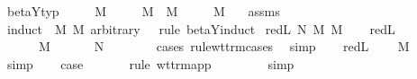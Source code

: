 \begin{isabellebody}
%
\isadelimproof
\isanewline
%
\endisadelimproof
\isanewline
{}\isamarkupfalse%
\ beta{\isacharunderscore}Y{\isacharunderscore}typ{\isacharcolon}\isanewline
\ \ \ {\isachardoublequoteopen}{\isasymGamma}\ {\isasymturnstile}\ M\ {\isacharcolon}\ {\isasymsigma}{\isachardoublequoteclose}\isanewline
\ \ \ {\isachardoublequoteopen}M\ {\isasymRightarrow}\ M{\isacharprime}{\isachardoublequoteclose}\isanewline
\ \ \ {\isachardoublequoteopen}{\isasymGamma}\ {\isasymturnstile}\ M{\isacharprime}\ {\isacharcolon}\ {\isasymsigma}{\isachardoublequoteclose}\isanewline
%
\isadelimproof
%
\endisadelimproof
%
\isatagproof
{}\isamarkupfalse%
\ assms{\isacharparenleft}{}{\isacharcomma}{}{\isacharparenright}\isanewline
{}\isamarkupfalse%
\ {\isacharparenleft}induct\ \ M\ M{\isacharprime}\ arbitrary{\isacharcolon}\ {\isasymGamma}\ {\isasymsigma}\ rule{\isacharcolon}\ beta{\isacharunderscore}Y{\isachardot}induct{\isacharparenright}\isanewline
{}\isamarkupfalse%
\ {\isacharparenleft}red{\isacharunderscore}L\ N\ M\ M{\isacharprime}{\isacharparenright}\isanewline
\ \ \isamarkupfalse%
\ red{\isacharunderscore}L{\isacharparenleft}{}{\isacharparenright}\ \isamarkupfalse%
\ {\isasymtau}\ \ {}{\isacharcolon}\ {\isachardoublequoteopen}{\isasymGamma}\ {\isasymturnstile}\ M\ {\isacharcolon}\ {\isasymtau}\ {\isasymrightarrow}\ {\isasymsigma}{\isachardoublequoteclose}\ {\isachardoublequoteopen}{\isasymGamma}\ {\isasymturnstile}\ N\ {\isacharcolon}\ {\isasymtau}{\isachardoublequoteclose}\isanewline
\ \ \ \ \isamarkupfalse%
\ {\isacharparenleft}cases\ rule{\isacharcolon}wt{\isacharunderscore}trm{\isachardot}cases{\isacharparenright}\ \isamarkupfalse%
\ simp\isanewline
\ \ \isamarkupfalse%
\ red{\isacharunderscore}L{\isacharparenleft}{}{\isacharparenright}\ \isamarkupfalse%
\ {\isachardoublequoteopen}{\isasymGamma}\ {\isasymturnstile}\ M{\isacharprime}\ {\isacharcolon}\ {\isasymtau}\ {\isasymrightarrow}\ {\isasymsigma}{\isachardoublequoteclose}\ \isamarkupfalse%
\ simp\isanewline
\ \ \isamarkupfalse%
\ {\isacharquery}case\ \isanewline
\ \ \ \ \isamarkupfalse%
\ {\isacharparenleft}rule\ wt{\isacharunderscore}trm{\isachardot}app{\isacharparenright}\isanewline
\ \ \ \ \isamarkupfalse%
\ {}\ \isamarkupfalse%
\ simp\isanewline

\end{isabellebody}
